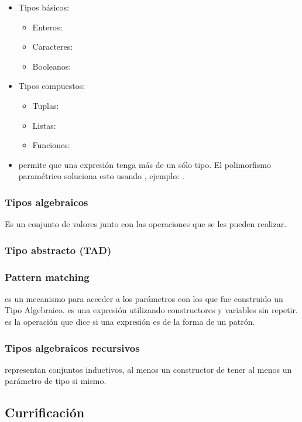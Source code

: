 \begin{itemize}
  \item Tipos básicos:
    \begin{itemize}
      \item Enteros: 
      \item Caracteres: 
      \item Booleanos: 
    \end{itemize}
  \item Tipos compuestos:
    \begin{itemize}
      \item Tuplas: 
      \item Listas: \xtt{[A]}
      \item Funciones: 
    \end{itemize}
  \item {} permite que una expresión tenga más de un sólo tipo. El polimorfismo paramétrico soluciona esto usando , ejemplo: .
\end{itemize}

\subsubsection{Tipos algebraicos} Es un conjunto de valores junto con las operaciones que se les pueden realizar.

\subsubsection{Tipo abstracto (TAD)}

\subsubsection{Pattern matching} es un mecanismo para acceder a los parámetros con los que fue construido un Tipo Algebraico.  es una expresión utilizando constructores y variables sin repetir.  es la operación que dice si una expresión es de la forma de un patrón.

\subsubsection{Tipos algebraicos recursivos} representan conjuntos inductivos, al menos un constructor de tener al menos un parámetro de tipo si mismo.

\subsection{Currificación}

